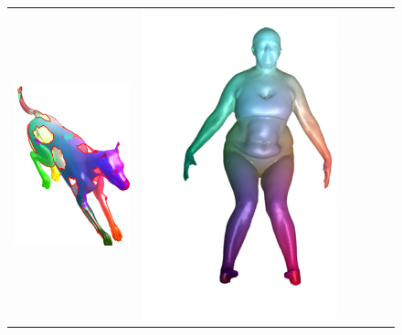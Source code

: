 \documentclass[10pt,twocolumn,letterpaper]{article}
\begin{document}
\begin{figure}[htb]
\begin{tabular}{cccccc}
	\includegraphics[scale=0.7]{figures/FailHolesmatch.png} &
	\includegraphics[scale=0.7]{figures/FailCutsbase.png} &

\end{tabular}
\end{figure}
\end{document}
